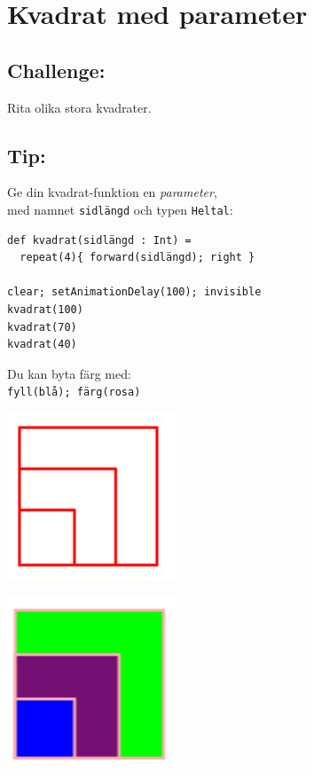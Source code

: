 \chapter{Kvadrat med parameter}
\begin{multicols}{2}
\section*{\color{BrickRed}Challenge:}
Rita olika stora kvadrater.
\section*{\color{OliveGreen}Tip:}
Ge din kvadrat-funktion en {\it parameter},\\
med namnet \lstinline{sidlängd} och typen \lstinline{Heltal}:

\begin{lstlisting}[basicstyle={\ttfamily\fontsize{16}{19}\selectfont},numbers=none]
def kvadrat(sidlängd : Int) = 
  repeat(4){ forward(sidlängd); right }

clear; setAnimationDelay(100); invisible
kvadrat(100) 
kvadrat(70)
kvadrat(40)
\end{lstlisting}
        
Du kan byta färg med:\\
\lstinline{fyll(blå); färg(rosa)}


\columnbreak


\begin{center}
\includegraphics[width=5.0cm]{../img/square-param.png}
\end{center}

\begin{center}
\includegraphics[width=5.0cm]{../img/square-param-color.png}
\end{center}

\end{multicols}

